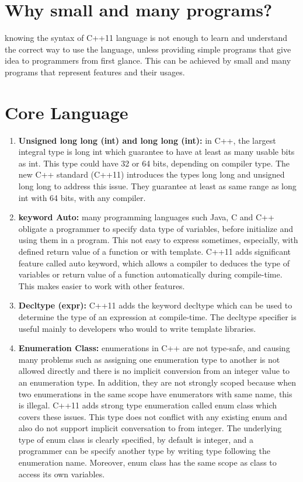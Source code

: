 \documentclass[12pt]{report}
\begin{document}
\section{Why small and many programs?}
\label{section: why small and many programs}
knowing the syntax of C++11 language is not enough to learn and understand the correct way to use the language, unless providing  simple  programs that give idea to programmers from first glance. This can be achieved by small and many programs that represent features and their usages.


\section{Core Language}
\label{section: core language}
 \begin{enumerate}
\item \textbf{Unsigned long long (int) and long long (int):} in C++, the largest integral type is long int which guarantee to have at least as many  usable bits as int. This type could have 32 or 64 bits, depending on compiler type. The new C++ standard (C++11) introduces the types long long and  unsigned long long to address this issue. They guarantee at least as same range as long int with 64 bits, with any compiler\cite{Gregorie:professionalcpp}.

\item \textbf{keyword Auto:} many programming languages such Java, C and C++ obligate a programmer to specify data type of variables, before initialize  and using them in a program. This not easy to express sometimes, especially, with defined return value of a function or with template. C++11 adds significant feature called auto keyword, which allows a compiler to deduces the type of variables or return value of a function automatically during compile-time. This makes easier to work with other features\cite{Prata:2012:Cpp}.

\item \textbf{Decltype (expr):} C++11 adds the keyword decltype which can be used to determine the type of an expression at compile-time. The decltype specifier is useful mainly to developers who would to write template libraries\cite{Gregorie:professionalcpp}.

\item  \textbf{Enumeration Class:} enumerations in C++ are not type-safe, and causing many problems such as assigning one enumeration type to another is not allowed directly and there is no implicit conversion from an integer value to an enumeration type. In addition, they are not strongly scoped because when two enumerations in the same scope have enumerators with same name, this is illegal. C++11 adds strong type enumeration called enum class which covers these issues. This type does not conflict with any existing enum and also do not support implicit conversation to from integer. The underlying type of enum class is clearly specified, by default is integer, and a programmer can be specify another type by writing type following the enumeration name. Moreover, enum class has the same scope as class to access its own variables\cite{Gregorie:professionalcpp}.
  

\end{enumerate}
\end{document}
